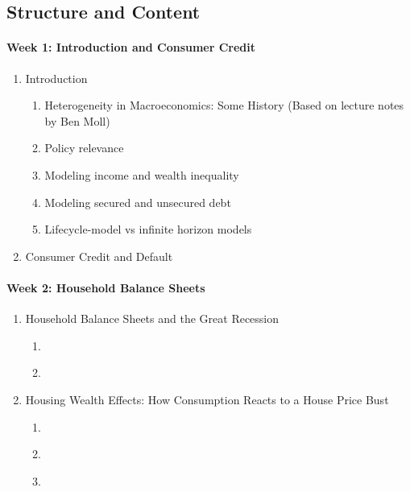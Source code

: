\documentclass[a4paper,11pt]{article}
\begin{document}
\subsection*{Structure and Content}

\paragraph{Week 1: Introduction and Consumer Credit}
\begin{enumerate}
\item Introduction
  \begin{enumerate}
  \item Heterogeneity in Macroeconomics: Some History (Based on lecture notes by Ben Moll)
  \item Policy relevance
  \item Modeling income and wealth inequality
  \item Modeling secured and unsecured debt
  \item Lifecycle-model vs infinite horizon models    
  \end{enumerate}

\item Consumer Credit and Default \citep{athreya2002welfare,chatterjee2007quantitative,livshits2007consumer}
\end{enumerate}

\paragraph{Week 2: Household Balance Sheets}

\begin{enumerate}
\item Household Balance Sheets and the Great Recession
  \begin{enumerate}
  \item \cite{mian2013household}
  \item \cite{berger2015consumption}
  \end{enumerate}
\item Housing Wealth Effects: How Consumption Reacts to a House Price Bust
  \begin{enumerate}
  \item \cite{berger2018house}
  \item \cite{guren2021housing}
  \item \cite{greimel2019understanding}
  \end{enumerate}
\end{enumerate}
\end{document}
